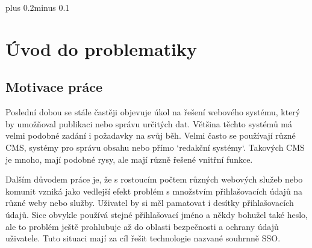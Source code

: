 \documentclass[11pt,twoside,a4paper]{book}
\begin{document}
\mainbodystarts
\normalfont
{}\baselineskip plus 0.2\baselineskip minus 0.1\baselineskip



% 
% 

\chapter{Úvod do problematiky}

\section{Motivace práce}
Poslední dobou se stále častěji objevuje úkol na řešení webového systému, který by umožňoval publikaci nebo správu určitých dat. Většina těchto systémů má velmi podobné zadání i požadavky na svůj běh. Velmi často se používají různé CMS, systémy pro správu obsahu nebo přímo `redakční systémy`. Takových CMS je mnoho, mají podobné rysy, ale mají různě řešené vnitřní funkce.
\par
Dalším důvodem práce je, že s rostoucím počtem různých webových služeb nebo komunit vzniká jako vedlejší efekt problém s množstvím přihlašovacích údajů na různé weby nebo služby. Uživatel by si měl pamatovat i desítky přihlašovacích údajů. Sice obvykle používá stejné přihlašovací jméno a někdy bohužel také heslo, ale to problém ještě prohlubuje až do oblasti bezpečnosti a ochrany údajů uživatele. Tuto situaci mají za cíl řešit technologie nazvané souhrnně SSO.


\end{document}
